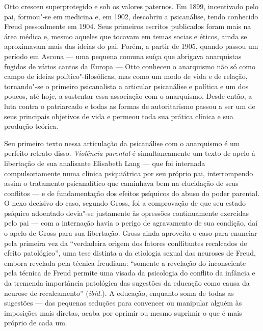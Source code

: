 Otto cresceu superprotegido e sob os valores paternos. Em 1899,
incentivado pelo pai, formou"-se em medicina e, em 1902, descobriu a
psicanálise, tendo conhecido Freud pessoalmente em 1904. Seus primeiros
escritos publicados foram mais na área médica e, mesmo aqueles que
tocavam em temas socias e éticos, ainda se aproximavam mais das ideias
do pai. Porém, a partir de 1905, quando passou um período em Ascona ---
uma pequena comuna suíça que abrigava anarquistas fugidos de vários
cantos da Europa --- Otto conheceu o anarquismo não só como campo de
ideias político"-filosóficas, mas como um modo de vida e de relação,
tornando"-se o primeiro psicanalista a articular psicanálise e política e
um dos poucos, até hoje, a sustentar essa associação com o anarquismo.
Desde então, a luta contra o patriarcado e todas as formas de
autoritarismo passou a ser um de seus principais objetivos de vida e
permeou toda sua prática clínica e sua produção teórica.

Seu primeiro texto nessa articulação da psicanálise com o anarquismo é
um perfeito retrato disso. \emph{Violência parental} é simultaneamente
um texto de apelo à libertação de sua analisante Elisabeth Lang --- que
foi internada compulsoriamente numa clínica psiquiátrica por seu próprio
pai, interrompendo assim o tratamento psicanalítico que caminhava bem na
elucidação de seus conflitos --- e de fundamentação dos efeitos psíquicos
do abuso do poder parental. O nexo decisivo do caso, segundo Gross, foi
a comprovação de que seu estado psíquico adoentado devia"-se justamente
às opressões continuamente exercidas pelo pai --- com a internação havia
o perigo de agravamento de sua condição, daí o apelo de Gross para sua
libertação. Gross ainda aproveita o caso para enunciar pela primeira vez
da ``verdadeira origem dos fatores conflitantes recalcados de efeito
patológico'', uma tese distinta a da etiologia sexual das neuroses de
Freud, embora revelada pela técnica freudiana: ``somente a revelação do
inconsciente pela técnica de Freud permite uma visada da psicologia do
conflito da infância e da tremenda importância patológica das sugestões
da educação como causa da neurose de recalcamento'' (\emph{ibid.}). A
educação, enquanto soma de todas as sugestões --- das pequenas seduções
para convencer ou manipular alguém às imposições mais diretas, acaba por
oprimir ou mesmo suprimir o que é mais próprio de cada um.

